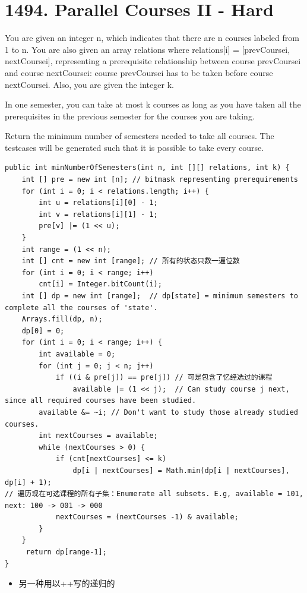 \documentclass[9pt, b5paaper]{book}
\begin{document}
\section{1494. Parallel Courses II - Hard}
\label{sec-11-3}
You are given an integer n, which indicates that there are n courses labeled from 1 to n. You are also given an array relations where relations[i] = [prevCoursei, nextCoursei], representing a prerequisite relationship between course prevCoursei and course nextCoursei: course prevCoursei has to be taken before course nextCoursei. Also, you are given the integer k.

In one semester, you can take at most k courses as long as you have taken all the prerequisites in the previous semester for the courses you are taking.

Return the minimum number of semesters needed to take all courses. The testcases will be generated such that it is possible to take every course.
\begin{verbatim}
public int minNumberOfSemesters(int n, int [][] relations, int k) {
    int [] pre = new int [n]; // bitmask representing prerequirements
    for (int i = 0; i < relations.length; i++) {
        int u = relations[i][0] - 1;
        int v = relations[i][1] - 1;
        pre[v] |= (1 << u);
    }
    int range = (1 << n);
    int [] cnt = new int [range]; // 所有的状态只数一遍位数
    for (int i = 0; i < range; i++) 
        cnt[i] = Integer.bitCount(i);
    int [] dp = new int [range];  // dp[state] = minimum semesters to complete all the courses of 'state'.
    Arrays.fill(dp, n);
    dp[0] = 0;
    for (int i = 0; i < range; i++) {
        int available = 0;
        for (int j = 0; j < n; j++) 
            if ((i & pre[j]) == pre[j]) // 可是包含了忆经选过的课程
                available |= (1 << j);  // Can study course j next, since all required courses have been studied.
        available &= ~i; // Don't want to study those already studied courses.
        int nextCourses = available;
        while (nextCourses > 0) {
            if (cnt[nextCourses] <= k)
                dp[i | nextCourses] = Math.min(dp[i | nextCourses], dp[i] + 1);
// 遍历现在可选课程的所有子集：Enumerate all subsets. E.g, available = 101, next: 100 -> 001 -> 000
            nextCourses = (nextCourses -1) & available; 
        }
    }
     return dp[range-1];
}
\end{verbatim}
\begin{itemize}
\item 另一种用以++写的递归的
\end{itemize}
\end{document}

